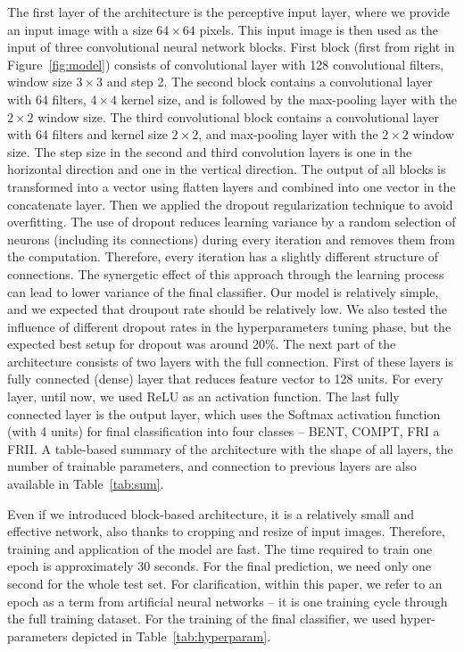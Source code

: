 \documentclass[fleqn,usenatbib]{mnras}
\begin{document}
The first layer of the architecture is the perceptive input layer, where we provide an input image with a size $64\times64$ pixels. This input image is then used as the input of three convolutional neural network blocks. First block (first from right in Figure~\ref{fig:model}) consists of convolutional layer with 128 convolutional filters, window size $3\times3$ and step 2. The second block contains a convolutional layer with 64 filters, $4\times4$ kernel size, and is followed by the max-pooling layer with the $2\times2$ window size. The third convolutional block contains a convolutional layer with 64 filters and kernel size $2\times2$, and max-pooling layer with the $2\times2$ window size. The step size in the second and third convolution layers is one in the horizontal direction and one in the vertical direction. The output of all blocks is transformed into a vector using flatten layers and combined into one vector in the concatenate layer. Then we applied the dropout regularization technique to avoid overfitting. The use of dropout reduces learning variance by a random selection of neurons (including its connections) during every iteration and removes them from the computation. Therefore, every iteration has a slightly different structure of connections. The synergetic effect of this approach  through the learning process can lead to lower variance of the final classifier. Our model is relatively simple, and we expected that droupout rate should be relatively low. We also tested the influence of different dropout rates in the hyperparameters tuning phase, but the expected best setup for dropout was around 20\%. The next part of the architecture consists of two layers with the full connection. First of these layers is  fully connected (dense) layer that reduces feature vector to 128 units. For every layer, until now, we used ReLU as an activation function. The last fully connected layer is the output layer, which uses the Softmax activation function (with 4 units) for final classification into four classes – BENT, COMPT, FRI a FRII. A table-based summary of the architecture with the shape of all layers, the number of trainable parameters, and connection to previous layers are also available in Table~\ref{tab:sum}.

Even if we introduced block-based architecture, it is a relatively small and effective network, also thanks to cropping and resize of input images. Therefore, training and application of the model are fast. The time required to train one epoch is approximately 30 seconds. For the final prediction, we need only one second for the whole test set. For clarification, within this paper, we refer to an epoch as a term from artificial neural networks – it is one training cycle through the full training dataset. For the training of the final classifier, we used hyper-parameters depicted in Table~\ref{tab:hyperparam}. 
\end{document}
